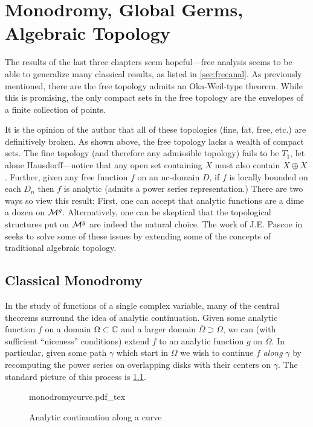 \chapter{Monodromy, Global Germs, Algebraic Topology}\label{ch:monodromy}

The results of the last three chapters seem hopeful---free analysis seems to be
able to generalize many classical results, as listed in \cref{sec:freeanal}. As
previously mentioned, there are the free topology admits an Oka-Weil-type theorem.
While this is promising, the only compact sets in the free topology are the
envelopes of a finite collection of points.

It is the opinion of the author that all of these topologies (fine, fat, free,
etc.) are definitively
broken. As shown above, the free topology lacks a wealth of compact sets.
The fine topology (and therefore any admissible topology)
fails to be \(T_1\), let alone Hausdorff---notice that any open set containing
\(X\) must also contain \(X\oplus X\). Further, given any free function \(f\)
on an nc-domain \(D\), if \(f\) is locally bounded on each \(D_n\) then \(f\)
is analytic (admits a power series representation.) There are two ways so view
this result: First, one can accept that analytic functions are a dime a dozen on
\(\mathcal{M}^{g} \). Alternatively, one can be skeptical that the topological
structures put on \(\mathcal{M}^{g} \) are indeed the natural choice. The work of J.E.
Pascoe in \cite{pascoeFreeNoncommutativePrincipal2020} seeks to solve some of
these issues by extending some of the concepts of traditional algebraic
topology.

\section{Classical Monodromy}%
\label{sec:classmono}

In the study of functions of a single complex variable, many of the central
theorems surround the idea of analytic continuation. Given some analytic
function \(f\) on a domain \(\Omega \subset\mathbb{C} \) and a larger domain
\(\overline{\Omega} \supset \Omega\), we can (with sufficient
``niceness'' conditions) extend \(f\) to an analytic function \(g\) on
\(\overline{\Omega}\). In particular, given some path \(\gamma\) which start in
\(\Omega\) we wish to continue \(f\) \emph{along} \(\gamma\) by recomputing the
power series on overlapping disks with their centers on \(\gamma\). The
standard picture of this process is \cref{fig:monocurve}.
\begin{figure}[h!]%
\centering
  \def\svgwidth{0.8\columnwidth}
  {monodromycurve.pdf_tex}
\caption{Analytic continuation along a curve}
\label{fig:monocurve}
\end{figure}

